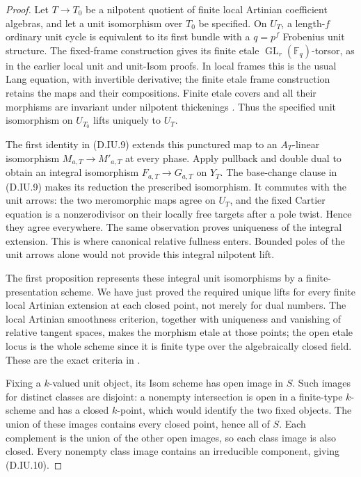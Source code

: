 \begin{proof}
Let $T\to T_0$ be a nilpotent quotient of finite local
Artinian coefficient algebras, and let a unit isomorphism
over $T_0$ be specified. On $U_T$, a length-$f$ ordinary
unit cycle is equivalent to its first bundle with a
$q=p^f$ Frobenius unit structure. The fixed-frame
construction gives its finite etale
$\operatorname{GL}_r(\mathbb F_q)$-torsor, as in the
earlier local unit and unit-Isom proofs. In local frames
this is the usual Lang equation, with invertible derivative;
the finite etale frame construction retains the maps and
their compositions. Finite etale covers and all their
morphisms are invariant under nilpotent thickenings
\citep[Lemma 58.8.3, Tag 0BQB]{StacksIntrinsicUnitHomD}.
Thus the specified unit isomorphism on $U_{T_0}$ lifts
uniquely to $U_T$.

The first identity in (D.IU.9) extends this punctured map
to an $A_T$-linear isomorphism $M_{a,T}\to M'_{a,T}$ at
every phase. Apply pullback and double dual to obtain an
integral isomorphism $F_{a,T}\to G_{a,T}$ on $Y_T$.
The base-change clause in (D.IU.9) makes its reduction
the prescribed isomorphism. It commutes with the unit
arrows: the two meromorphic maps agree on $U_T$, and the
fixed Cartier equation is a nonzerodivisor on their
locally free targets after a pole twist. Hence they agree
everywhere. The same observation proves uniqueness of
the integral extension. This is where canonical relative
fullness enters. Bounded poles of the unit arrows alone
would not provide this integral nilpotent lift.

The first proposition represents these integral unit
isomorphisms by a finite-presentation scheme. We have just
proved the required unique lifts for every finite local
Artinian extension at each closed point, not merely for
dual numbers. The local Artinian smoothness criterion,
together with uniqueness and vanishing of relative
tangent spaces, makes the morphism etale at those points;
the open etale locus is the whole scheme since it is
finite type over the algebraically closed field. These
are the exact criteria in
\citep[Tags 02HT, 02HM and 00UR]{StacksIntrinsicUnitHomD}.

Fixing a $k$-valued unit object, its Isom scheme has open
image in $S$. Such images for distinct classes are
disjoint: a nonempty intersection is open in a finite-type
$k$-scheme and has a closed $k$-point, which would identify
the two fixed objects. The union of these images contains
every closed point, hence all of $S$. Each complement is
the union of the other open images, so each class image
is also closed. Every nonempty class image contains an
irreducible component, giving (D.IU.10).


\end{proof}
